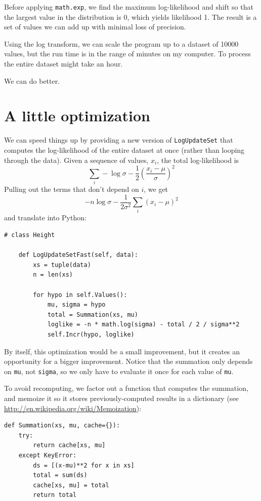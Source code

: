 \documentclass[12pt]{book}
\begin{document}
Before applying {\tt math.exp}, we find the maximum log-likelihood
and shift so that the largest value in the distribution is 0, which
yields likelihood 1.  The result is a set of values we can add
up with minimal loss of precision.

Using the log transform, we can scale the program up to a dataset
of 10000 values, but the run time is in the range of minutes on
my computer.  To process the entire dataset might take an hour.

We can do better.


\section{A little optimization}

We can speed things up by providing a new version of \verb"LogUpdateSet"
that computes the log-likelihood of the entire dataset at once (rather
than looping through the data).  Given a sequence of values, $x_i$,
the total log-likelihood is
%
\[ \sum_i -\log \sigma - \frac{1}{2} \left( \frac{x_i-\mu}{\sigma} \right)^2 \]
%
Pulling out the terms that don't depend on $i$, we get
%
\[ -n \log \sigma - \frac{1}{2 \sigma^2} \sum_i \left( x_i-\mu \right)^2 \]
%
and translate into Python:

\begin{verbatim}
# class Height

    def LogUpdateSetFast(self, data):
        xs = tuple(data)
        n = len(xs)

        for hypo in self.Values():
            mu, sigma = hypo
            total = Summation(xs, mu)
            loglike = -n * math.log(sigma) - total / 2 / sigma**2
            self.Incr(hypo, loglike)
\end{verbatim}

By itself, this optimization would be a small improvement, but it
creates an opportunity for a bigger improvement.  Notice that the
summation only depends on {\tt mu}, not {\tt sigma}, so we only
have to evaluate it once for each value of {\tt mu}.

To avoid recomputing, we factor out a function that computes
the summation, and memoize it so it stores previously-computed
results in a dictionary (see \url{http://en.wikipedia.org/wiki/Memoization}):

\begin{verbatim}
def Summation(xs, mu, cache={}):
    try:
        return cache[xs, mu]
    except KeyError:
        ds = [(x-mu)**2 for x in xs]
        total = sum(ds)
        cache[xs, mu] = total
        return total
\end{verbatim}
\end{document}
